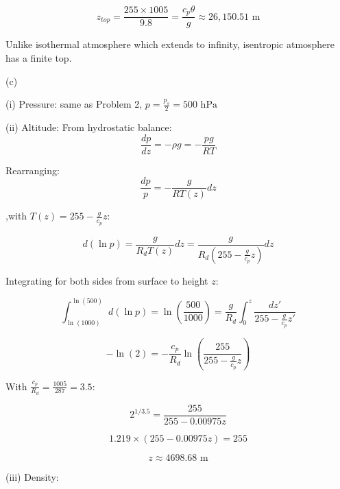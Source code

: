 \documentclass[letterpaper, 11pt]{article}
\newcommand{\1}{\mathds{1}}	%
\theoremstyle{definition}
\begin{document}
\begin{equation*}
    z_{top} = \frac{255 \times 1005}{9.8} = \frac{c_p\theta}{g} \approx 26,150.51 \text{ m}
\end{equation*}

Unlike isothermal atmosphere which extends to infinity, isentropic atmosphere has a finite top.

(c)

(i) Pressure: same as Problem 2, $p = \frac{p_s}{2} = 500 \text{ hPa}$

(ii) Altitude:
From hydrostatic balance:
\begin{equation*}
\frac{dp}{dz} = -\rho g = -\frac{pg}{RT}
\end{equation*}

Rearranging:
\begin{equation*}
\frac{dp}{p} = -\frac{g}{RT(z)}dz
\end{equation*}

,with $T(z) = 255 - \frac{g}{c_p}z$:

\begin{equation*}
d(\ln p) = \frac{g}{R_dT(z)}dz = \frac{g}{R_d(255 - \frac{g}{c_p}z)}dz
\end{equation*}

Integrating for both sides from surface to height $z$:

\begin{equation*}
\int_{\ln(1000)}^{\ln(500)} d(\ln p)=\ln\left(\frac{500}{1000}\right) = \frac{g}{R_d}\int_0^z \frac{dz'}{255 - \frac{g}{c_p}z'}
\end{equation*}

\begin{equation*}
-\ln(2) = -\frac{c_p}{R_d}\ln\left(\frac{255}{255 - \frac{g}{c_p}z}\right)
\end{equation*}

With $\frac{c_p}{R_d} = \frac{1005}{287} = 3.5$:

\begin{equation*}
2^{1/3.5} = \frac{255}{255 - 0.00975z}
\end{equation*}

\begin{equation*}
1.219 \times (255 - 0.00975z) = 255
\end{equation*}

\begin{equation*}
z \approx 4698.68\text{ m}
\end{equation*}

(iii) Density:
\end{document}
